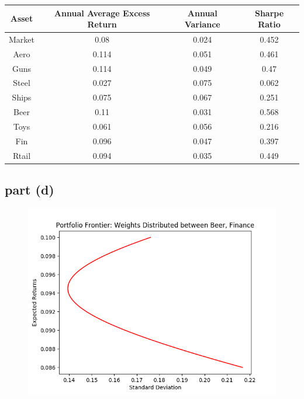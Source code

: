 \documentclass[12pt]{article}
\begin{document}
			\begin{center}
 			\begin{tabular}{||c|c|c|c||} 
 				\hline
 					Asset & Annual Average Excess Return & Annual Variance & Sharpe Ratio \\
 				\hline\hline
 					Market & 0.08 & 0.024 & 0.452 \\ 
 				\hline
					Aero & 0.114 & 0.051 & 0.461 \\
 				\hline
 					Guns & 0.114 & 0.049 & 0.47 \\
 				\hline
 					Steel & 0.027 & 0.075 & 0.062 \\
 				\hline
 					Ships & 0.075 & 0.067 & 0.251 \\
				 \hline
				  	Beer & 0.11 & 0.031 & 0.568 \\
				 \hline
				  	Toys & 0.061 & 0.056 & 0.216 \\				 
				  \hline
				  	Fin & 0.096 & 0.047 & 0.397 \\
				  \hline
					Rtail & 0.094 & 0.035 & 0.449 \\
				  \hline
					
			\end{tabular}
			\end{center}
			
		\subsection{part (d)}
		
			\begin{figure}[h]
			\centering
				\includegraphics[scale=0.75]{hw1_image2.png}
			\end{figure}
		
\end{document}
